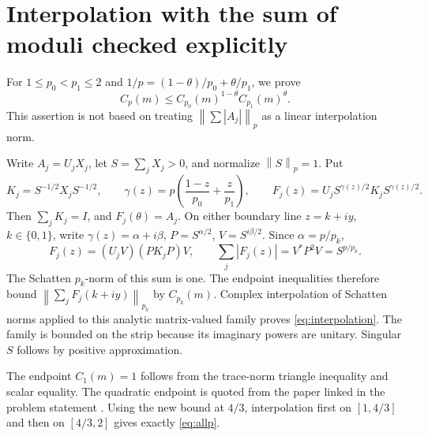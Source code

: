 \documentclass[11pt]{article}
\newcommand{\norm}[1]{\left\lVert#1\right\rVert}
\theoremstyle{remark}\newtheorem{remark}[theorem]{Remark}
\begin{document}
\section{Interpolation with the sum of moduli checked explicitly}\label{sec:interpolation}
For \(1\le p_0<p_1\le2\) and \(1/p=(1-\theta)/p_0+\theta/p_1\), we prove
\begin{equation}\label{eq:interpolation}
 C_p(m)\le C_{p_0}(m)^{1-\theta}C_{p_1}(m)^\theta.
\end{equation}
This assertion is not based on treating \(\norm{\sum|A_j|}_p\) as a linear interpolation norm.

Write \(A_j=U_jX_j\), let \(S=\sum_jX_j>0\), and normalize \(\norm S_p=1\). Put
\[
 K_j=S^{-1/2}X_jS^{-1/2},\qquad
 \gamma(z)=p\left(\frac{1-z}{p_0}+\frac z{p_1}\right),\qquad
 F_j(z)=U_jS^{\gamma(z)/2}K_jS^{\gamma(z)/2}.
\]
Then \(\sum_jK_j=I\), and \(F_j(\theta)=A_j\). On either boundary line \(z=k+iy\), \(k\in\{0,1\}\), write \(\gamma(z)=\alpha+i\beta\), \(P=S^{\alpha/2}\), \(V=S^{i\beta/2}\). Since \(\alpha=p/p_k\),
\[
 F_j(z)=(U_jV)(PK_jP)V,\qquad
 \sum_j|F_j(z)|=V^*P^2V=S^{p/p_k}.
\]
The Schatten \(p_k\)-norm of this sum is one. The endpoint inequalities therefore bound \(\norm{\sum_jF_j(k+iy)}_{p_k}\) by \(C_{p_k}(m)\). Complex interpolation of Schatten norms applied to this analytic matrix-valued family proves \eqref{eq:interpolation}. The family is bounded on the strip because its imaginary powers are unitary. Singular \(S\) follows by positive approximation.

The endpoint \(C_1(m)=1\) follows from the trace-norm triangle inequality and scalar equality. The quadratic endpoint is quoted from the paper linked in the problem statement \cite{quadratic}. Using the new bound at \(4/3\), interpolation first on \([1,4/3]\) and then on \([4/3,2]\) gives exactly \eqref{eq:allp}.
\end{document}
